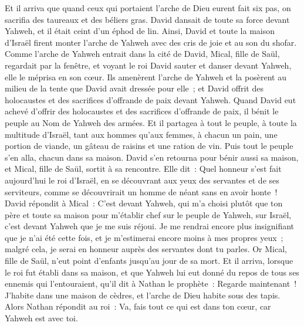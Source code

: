 \begin{multicols}{2}
Et il arriva que quand ceux qui portaient l'arche de Dieu eurent fait six pas, on sacrifia des taureaux et des béliers gras.
David dansait de toute sa force devant Yahweh, et il était ceint d'un éphod de lin.
Ainsi, David et toute la maison d'Israël firent monter l'arche de Yahweh avec des cris de joie et au son du shofar.
Comme l'arche de Yahweh entrait dans la cité de David, Mical, fille de Saül, regardait par la fenêtre, et voyant le roi David sauter et danser devant Yahweh, elle le méprisa en son cœur.
Ils amenèrent l'arche de Yahweh et la posèrent au milieu de la tente que David avait dressée pour elle~; et David offrit des holocaustes et des sacrifices d'offrande de paix devant Yahweh.
Quand David eut achevé d'offrir des holocaustes et des sacrifices d'offrande de paix, il bénit le peuple au Nom de Yahweh des armées.
Et il partagea à tout le peuple, à toute la multitude d'Israël, tant aux hommes qu'aux femmes, à chacun un pain, une portion de viande, un gâteau de raisins et une ration de vin. Puis tout le peuple s'en alla, chacun dans sa maison.
David s'en retourna pour bénir aussi sa maison, et Mical, fille de Saül, sortit à sa rencontre. Elle dit~: Quel honneur s'est fait aujourd'hui le roi d'Israël, en se découvrant aux yeux des servantes et de ses serviteurs, comme se découvrirait un homme de néant sans en avoir honte~!
David répondit à Mical~: C'est devant Yahweh, qui m'a choisi plutôt que ton père et toute sa maison pour m'établir chef sur le peuple de Yahweh, sur Israël, c'est devant Yahweh que je me suis réjoui.
Je me rendrai encore plus insignifiant que je n'ai été cette fois, et je m'estimerai encore moins à mes propres yeux~; malgré cela, je serai en honneur auprès des servantes dont tu parles.
Or Mical, fille de Saül, n'eut point d'enfants jusqu'au jour de sa mort.
\VerseOne{}Et il arriva, lorsque le roi fut établi dans sa maison, et que Yahweh lui eut donné du repos de tous ses ennemis qui l'entouraient,
qu'il dit à Nathan le prophète~: Regarde maintenant~! J'habite dans une maison de cèdres, et l'arche de Dieu habite sous des tapis.
Alors Nathan répondit au roi~: Va, fais tout ce qui est dans ton cœur, car Yahweh est avec toi.

\end{multicols}
